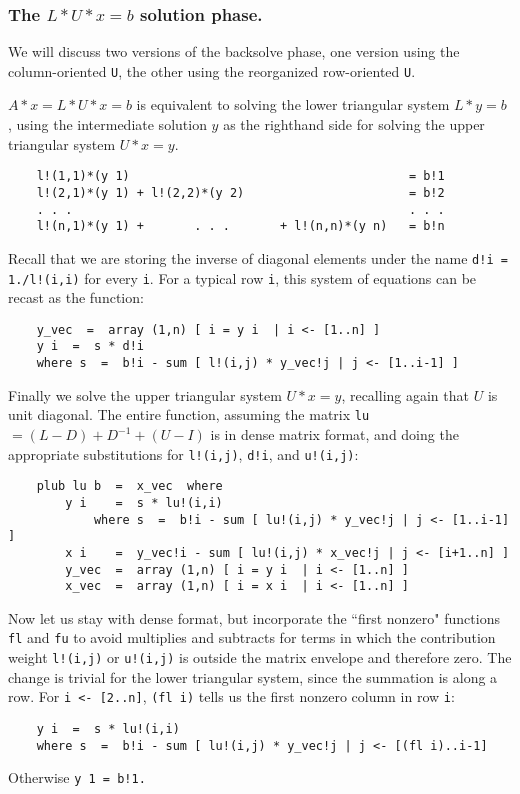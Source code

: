 \subsubsection{The $L*U*x = b$ solution phase.}

We will discuss two versions of the backsolve phase, one version
using the column-oriented {\tt U}, the other using the reorganized
row-oriented {\tt U}.

$A*x = L*U*x = b$ is equivalent to solving the lower triangular
system $L*y = b$ , using the intermediate solution $y$ as the
righthand side for solving the upper triangular system $U*x = y$.
\begin{verbatim}
    l!(1,1)*(y 1)                                       = b!1
    l!(2,1)*(y 1) + l!(2,2)*(y 2)                       = b!2
    . . .                                               . . .
    l!(n,1)*(y 1) +       . . .       + l!(n,n)*(y n)   = b!n
\end{verbatim}
Recall that we are storing the inverse of diagonal elements under the
name {\tt d!i = 1./l!(i,i)} for every {\tt i}.  For a typical row
{\tt i}, this system of equations can be recast as the function:
\begin{verbatim}
    y_vec  =  array (1,n) [ i = y i  | i <- [1..n] ]
    y i  =  s * d!i
    where s  =  b!i - sum [ l!(i,j) * y_vec!j | j <- [1..i-1] ]
\end{verbatim}

Finally we solve the upper triangular system $U*x = y$, recalling again
that $U$ is unit diagonal.
The entire function, assuming the matrix {\tt lu} $= (L-D) + D^{-1} +
(U-I)$ is in dense matrix format, and doing the appropriate substitutions
for {\tt l!(i,j)}, {\tt d!i}, and {\tt u!(i,j)}:
\begin{verbatim}
    plub lu b  =  x_vec  where
        y i    =  s * lu!(i,i)
            where s  =  b!i - sum [ lu!(i,j) * y_vec!j | j <- [1..i-1] ]
        x i    =  y_vec!i - sum [ lu!(i,j) * x_vec!j | j <- [i+1..n] ]
        y_vec  =  array (1,n) [ i = y i  | i <- [1..n] ]
        x_vec  =  array (1,n) [ i = x i  | i <- [1..n] ]
\end{verbatim}

Now let us stay with dense format, but incorporate the ``first
nonzero" functions {\tt fl} and {\tt fu} to avoid multiplies and
subtracts for terms in which the contribution weight {\tt l!(i,j)} or
{\tt u!(i,j)} is outside the matrix envelope and therefore zero.  The
change is trivial for the lower triangular system, since the summation
is along a row.  For {\tt i <- [2..n]}, {\tt (fl i)} tells us the first
nonzero column in row {\tt i}:
\begin{verbatim}
    y i  =  s * lu!(i,i)
    where s  =  b!i - sum [ lu!(i,j) * y_vec!j | j <- [(fl i)..i-1]
\end{verbatim}
Otherwise {\tt y 1  =  b!1. }

